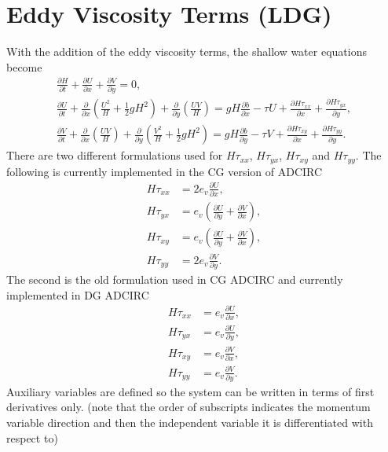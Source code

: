 \documentclass[11pt]{article}
\begin{document}
\section{Eddy Viscosity Terms (LDG)}
With the addition of the eddy viscosity terms, the shallow water equations become
\begin{gather}
\frac{\partial H}{\partial t} + \frac{\partial U}{\partial x} + \frac{\partial V}{\partial y} = 0,\\
\frac{\partial U}{\partial t} + \frac{\partial}{\partial x}\left(\frac{U^2}{H} + \frac{1}{2}gH^2 \right) + \frac{\partial}{\partial y}\left(\frac{UV}{H} \right) = gH\frac{\partial b}{\partial x} - \tau U  + \frac{\partial H\tau_{xx}}{\partial x}  + \frac{\partial H\tau_{yx}}{\partial y},\\
\frac{\partial V}{\partial t} + \frac{\partial}{\partial x}\left(\frac{UV}{H} \right) + \frac{\partial}{\partial y}\left(\frac{V^2}{H} + \frac{1}{2}gH^2 \right) = gH\frac{\partial b}{\partial y} - \tau V + \frac{\partial H\tau_{xy}}{\partial x} + \frac{\partial H\tau_{yy}}{\partial y}.
\end{gather}
There are two different formulations used for $H\tau_{xx}$, $H\tau_{yx}$, $H\tau_{xy}$ and $H\tau_{yy}$.  The following is currently implemented in the CG version of ADCIRC
\begin{align}
H\tau_{xx} &= 2e_v\frac{\partial U}{\partial x}, \\
H\tau_{yx} &= e_v\left(\frac{\partial U}{\partial y} + \frac{\partial V}{\partial x} \right), \\
H\tau_{xy} &= e_v\left(\frac{\partial U}{\partial y} + \frac{\partial V}{\partial x} \right), \\
H\tau_{yy} &= 2e_v\frac{\partial V}{\partial y}.
\end{align}
The second is the old formulation used in CG ADCIRC and currently implemented in DG ADCIRC
\begin{align}
H\tau_{xx} &= e_v\frac{\partial U}{\partial x}, \\
H\tau_{yx} &= e_v\frac{\partial U}{\partial y}, \\
H\tau_{xy} &= e_v\frac{\partial V}{\partial x}, \\
H\tau_{yy} &= e_v\frac{\partial V}{\partial y}.
\end{align}
Auxiliary variables are defined so the system can be written in terms of first derivatives only. (note that the order of subscripts indicates the momentum variable direction and then the independent variable it is differentiated with respect to)
\end{document}
